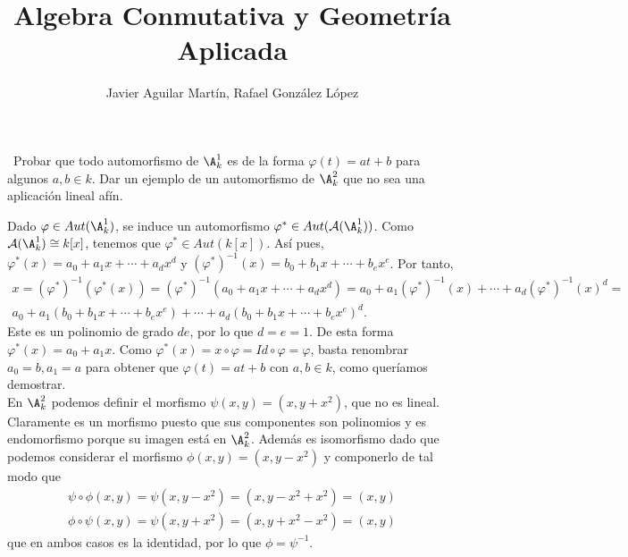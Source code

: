 \documentclass[twoside]{article}
\begin{document}
\title{Algebra Conmutativa y Geometría Aplicada}
\author{Javier Aguilar Martín, Rafael González López}
\maketitle
\begin{ejercicio}{5}\
Probar que todo automorfismo de $\A^1_k$ es de la forma $\varphi(t) = at+b$
para algunos $a, b \in k$. Dar un ejemplo de un automorfismo de $\A^2_k$ que no sea
una aplicación lineal afín.
\end{ejercicio}
\begin{solucion}
Dado $\varphi\in Aut(\A^1_k)$, se induce un automorfismo $\varphi^*\in Aut(\calA(\A^1_k))$. Como $\calA(\A^1_k)\cong k[x]$, tenemos que $\varphi^*\in Aut(k[x])$. Así pues, $\varphi^*(x)=a_0+a_1x+\cdots+a_dx^d$  y $(\varphi^*)^{-1}(x)=b_0+b_1x+\cdots+b_ex^e$. Por tanto,
\begin{gather*}
x=(\varphi^*)^{-1}(\varphi^*(x))=(\varphi^*)^{-1}(a_0+a_1x+\cdots+a_dx^d)=a_0+a_1(\varphi^*)^{-1}(x)+\cdots+a_d(\varphi^*)^{-1}(x)^d=\\
a_0+a_1(b_0+b_1x+\cdots+b_ex^e)+\cdots+a_d(b_0+b_1x+\cdots+b_ex^e)^d.
\end{gather*}
Este es un polinomio de grado $de$, por lo que $d=e=1$. De esta forma $\varphi^*(x)=a_0+a_1x$. Como $\varphi^*(x)=x\circ \varphi=Id\circ\varphi=\varphi$, basta renombrar $a_0=b, a_1=a$ para obtener que $\varphi(t)=at+b$ con $a,b\in k$, como queríamos demostrar.\\

En $\A^2_k$ podemos definir el morfismo $\psi(x,y)=(x,y+x^2)$, que no es lineal. Claramente es un morfismo puesto que sus componentes son polinomios y es endomorfismo porque su imagen está en $\A^2_k$. Además es isomorfismo dado que podemos considerar el morfismo $\phi(x,y)=(x,y-x^2)$ y componerlo de tal modo que
\begin{align*}
\psi\circ\phi(x,y)=\psi(x,y-x^2)=(x,y-x^2+x^2)=(x,y)\\
\phi\circ\psi(x,y)=\psi(x,y+x^2)=(x,y+x^2-x^2)=(x,y)
\end{align*}
que en ambos casos es la identidad, por lo que $\phi=\psi^{-1}$. 


\end{solucion}
\end{document}
